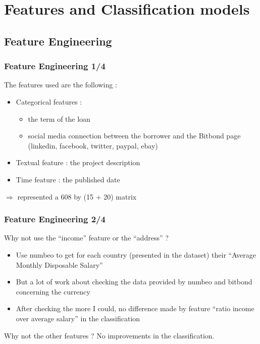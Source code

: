 \documentclass[10pt,handout,english]{beamer}
\begin{document}
	\section{Features and Classification models}
		\subsection{Feature Engineering}
		\begin{frame}
		\frametitle{Feature Engineering 1/4}
			The features used are the following :
			\begin{itemize}
				\item Categorical features :
				\begin{itemize}
					\item the term of the loan
					\item social media connection between the borrower and the Bitbond page (linkedin, facebook, twitter, paypal, ebay)
				\end{itemize}
				\item Textual feature : the project description
				\item Time feature : the published date
			\end{itemize}
			$\Rightarrow$ represented a 608 by (15 + 20) matrix
		\end{frame}

		\begin{frame}
		\frametitle{Feature Engineering 2/4}
			Why not use the ``income'' feature or the ``address'' ?
			\begin{itemize}
				\item Use numbeo to get for each country (presented in the dataset) their ``Average Monthly Disposable Salary''
				\item But a lot of work about checking the data provided by numbeo and bitbond concerning the currency
				\item After checking the more I could, no difference made by feature ``ratio income over average salary'' in the classification
			\end{itemize}
			Why not the other features ? No improvements in the classification.
		\end{frame}
\end{document}
